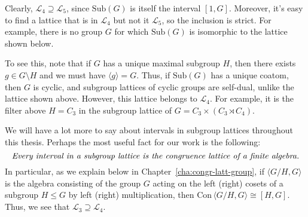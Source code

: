 \documentclass[cm,dissertation]{uhthesis}
\theoremstyle{plain}
\theoremstyle{definition}
\theoremstyle{remark}
\numberwithin{theorem}{section}
\numberwithin{claim}{chapter}
\numberwithin{equation}{section}
\numberwithin{conjecture}{chapter}
\newcommand{\<}{\ensuremath{\langle}}
\renewcommand{\>}{\ensuremath{\rangle}}
\renewcommand{\leq}{\ensuremath{\leqslant}}
\newcommand{\Con}{\ensuremath{\mathrm{Con\,}}}
\newcommand{\Sub}{\ensuremath{\mathrm{Sub}}}
\newcommand{\GAP}{\textsf{GAP}}
\newcommand{\0}{\ensuremath{\mathbf{0}}}
\newcommand{\1}{\ensuremath{\mathbf{1}}}
\newcommand{\2}{\ensuremath{\mathbf{2}}}
\newcommand{\3}{\ensuremath{\mathbf{3}}}
\newcommand{\4}{\ensuremath{\mathbf{4}}}
\newcommand{\5}{\ensuremath{\mathbf{5}}}
\newcommand{\sL}{\ensuremath{\mathscr{L}}}
\begin{document}
Clearly,  $\sL_4 \supseteq \sL_5$, since $\Sub(G)$ is itself the interval 
$[1, G]$.  Moreover, it's easy to find a lattice that is in $\sL_4$ but not it
$\sL_5$, so the inclusion is strict.  For example, there is no group $G$ for which
$\Sub(G)$ is isomorphic to the lattice shown below.  
\begin{center}

\end{center}
To see this, note that if
$G$ has a unique maximal subgroup $H$, then there exists $g\in G\setminus
H$ and we must have $\< g\> = G$.  Thus, if $\Sub(G)$ has a unique
coatom, then $G$ is cyclic, and subgroup lattices of cyclic groups are
self-dual, unlike the lattice shown above.
However, this lattice belongs to $\sL_4$.  For example, it is the 
filter above $H = C_3$ in the subgroup lattice of $G = C_3 \times (C_3 \rtimes
C_4)$. %

We will have a lot more to say about intervals in subgroup lattices throughout
this thesis.
Perhaps the most useful fact for our work is the following:
\begin{equation}
  \label{eq:Intro1}
\text{\emph{Every interval in a subgroup lattice is the congruence lattice of
  a finite algebra.}}
\end{equation}
In particular, as we explain below in Chapter~\ref{cha:congr-latt-group}, if 
$\<G/H, G\>$ is the algebra consisting of the group $G$
acting on the left (right) cosets of a subgroup $H \leq G$ by left (right)
multiplication, then $\Con\<G/H, G\> \cong [H, G]$.
Thus, we see that $\sL_3 \supseteq \sL_4$.
\end{document}
